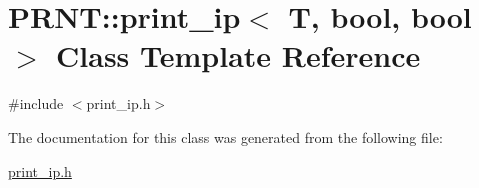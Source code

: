 \hypertarget{classPRNT_1_1print__ip}{\section{P\-R\-N\-T\-:\-:print\-\_\-ip$<$ T, bool, bool $>$ Class Template Reference}
\label{classPRNT_1_1print__ip}
}


{\ttfamily \#include $<$print\-\_\-ip.\-h$>$}



The documentation for this class was generated from the following file\-:\begin{DoxyCompactItemize}
\item 
\hyperlink{print__ip_8h}{print\-\_\-ip.\-h}\end{DoxyCompactItemize}
